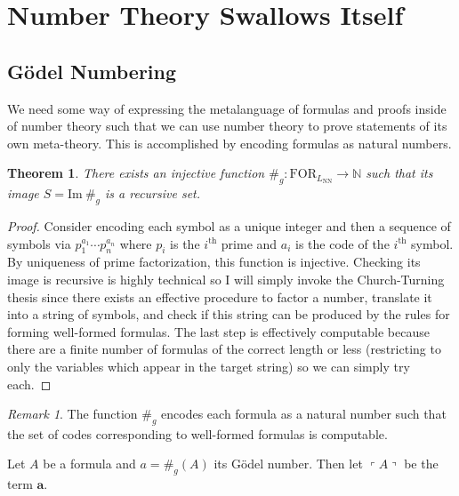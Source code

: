 \documentclass[12pt, leqno]{article}
\newcommand{\N}{\mathbb{N}}
\renewcommand{\bf}[1]{\mathbf{#1}}
\renewcommand{\Im}[1]{\mathrm{Im} \: #1}
\newcommand{\FOR}[1]{\mathrm{FOR}_{#1}}
\newenvironment{definition}[1][Definition:]{\begin{trivlist}
\item[\hskip \labelsep {\bfseries #1}]}{\end{trivlist}}
\theoremstyle{theorem}
\newtheorem{theorem}{Theorem}[section]
\theoremstyle{definition}
\theoremstyle{definition}
\theoremstyle{remark}
\theoremstyle{definition}
\theoremstyle{remark}
\newtheorem{remark}{Remark}[subsection]
\newcommand{\Gnum}[1]{\#_g\left( #1 \right)}
\newcommand{\Gterm}[1]{\left\ulcorner #1 \right\urcorner}
\begin{document}
\section{Number Theory Swallows Itself}



\subsection{G\"{o}del Numbering}

We need some way of expressing the metalanguage of formulas and proofs inside of number theory such that we can use number theory to prove statements of its own meta-theory. This is accomplished by encoding formulas as natural numbers. 

\begin{theorem}
There exists an injective function $\#_g : \FOR{L_{\mathrm{NN}}} \to \N$ such that its image $S = \Im{\#_g}$ is a recursive set. 
\end{theorem}

\begin{proof}
Consider encoding each symbol as a unique integer and then a sequence of symbols via $p_1^{a_1} \cdots p_n^{a_n}$ where $p_i$ is the $i^{\text{th}}$ prime and $a_i$ is the code of the $i^{\text{th}}$ symbol. By uniqueness of prime factorization, this function is injective. Checking its image is recursive is highly technical so I will simply invoke the Church-Turning thesis since there exists an effective procedure to factor a number, translate it into a string of symbols, and check if this string can be produced by the rules for forming well-formed formulas. The last step is effectively computable because there are a finite number of formulas of the correct length or less (restricting to only the variables which appear in the target string) so we can simply try each. 
\end{proof}

\begin{remark}
The function $\#_g$ encodes each formula as a natural number such that the set of codes corresponding to well-formed formulas is computable. 
\end{remark}

\begin{definition}
Let $A$ be a formula and $a = \Gnum{A}$ its G\"{o}del number. Then let $\Gterm{A}$ be the term $\bf{a}$. 
\end{definition}
\end{document}
